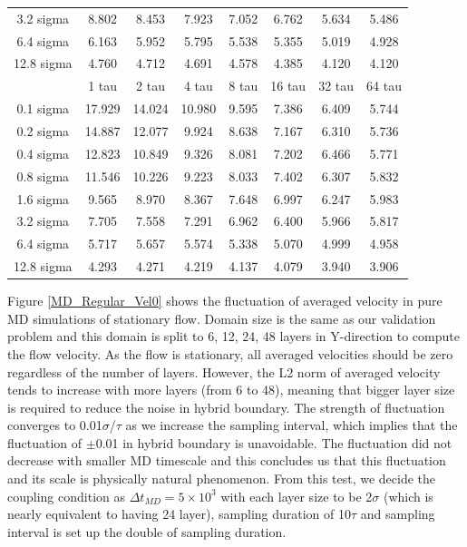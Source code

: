 \documentclass[conference,final]{IEEEtran}
\begin{document}
\begin{table}[t]
\begin{tabular}{c || c c c c c c c}
3.2 sigma	&	8.802 	&	8.453 	&	7.923 	&	7.052 	&	6.762 	&	5.634 	&	5.486 	\\
6.4 sigma	&	6.163 	&	5.952 	&	5.795 	&	5.538 	&	5.355 	&	5.019 	&	4.928 	\\
12.8 sigma	&	4.760 	&	4.712 	&	4.691 	&	4.578 	&	4.385 	&	4.120 	&	4.120 	\\
\hline
\hline
	&	1 tau	&	2 tau	&	4 tau	&	8 tau	&	16 tau	&	32 tau	&	64 tau	\\
\hline
0.1 sigma	&	17.929 	&	14.024 	&	10.980 	&	9.595 	&	7.386 	&	6.409 	&	5.744 	\\
0.2 sigma	&	14.887 	&	12.077 	&	9.924 	&	8.638 	&	7.167 	&	6.310 	&	5.736 	\\
0.4 sigma	&	12.823 	&	10.849 	&	9.326 	&	8.081 	&	7.202 	&	6.466 	&	5.771 	\\
0.8 sigma	&	11.546 	&	10.226 	&	9.223 	&	8.033 	&	7.402 	&	6.307 	&	5.832 	\\
1.6 sigma	&	9.565 	&	8.970 	&	8.367 	&	7.648 	&	6.997 	&	6.247 	&	5.983 	\\
3.2 sigma	&	7.705 	&	7.558 	&	7.291 	&	6.962 	&	6.400 	&	5.966 	&	5.817 	\\
6.4 sigma	&	5.717 	&	5.657 	&	5.574 	&	5.338 	&	5.070 	&	4.999 	&	4.958 	\\
12.8 sigma	&	4.293 	&	4.271 	&	4.219 	&	4.137 	&	4.079 	&	3.940 	&	3.906		\\
\hline
\end{tabular}
\vspace{-1em}
\end{table}



Figure \ref{MD_Regular_Vel0} shows the fluctuation of averaged velocity in pure MD simulations of stationary flow. Domain size is the same as our validation problem and this domain is split to 6, 12, 24, 48 layers in Y-direction to compute the flow velocity. As the flow is stationary, all averaged velocities should be zero regardless of the number of layers. However, the L2 norm of averaged velocity tends to increase with more layers (from 6 to 48), meaning that bigger layer size is required to reduce the noise in hybrid boundary. The strength of fluctuation converges to 0.01$\sigma$/$\tau$ as we increase the sampling interval, which implies that the fluctuation of $\pm$0.01 in hybrid boundary is unavoidable. The fluctuation did not decrease with smaller MD timescale and this concludes us that this fluctuation and its scale is physically natural phenomenon. From this test, we decide the coupling condition as $\Delta{t_{MD}}=5\times{10^{3}}$ with each layer size to be 2$\sigma$ (which is nearly equivalent to having 24 layer), sampling duration of 10$\tau$ and sampling interval is set up the double of sampling duration.
\end{document}
